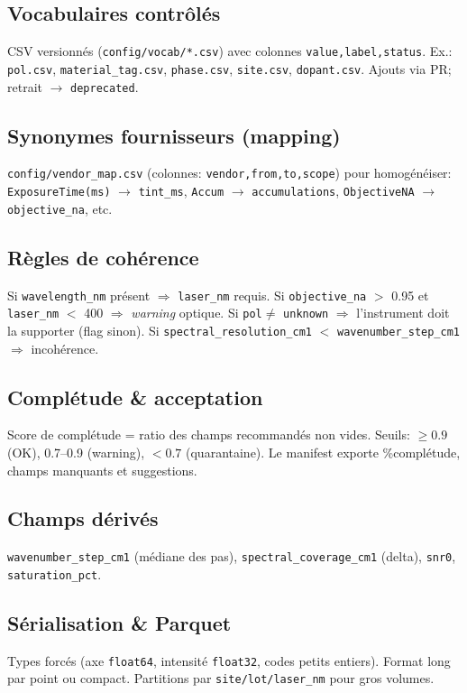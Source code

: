 \subsection{Vocabulaires contrôlés}
CSV versionnés (\texttt{config/vocab/*.csv}) avec colonnes \texttt{value,label,status}. Ex.: \texttt{pol.csv}, \texttt{material\_tag.csv}, \texttt{phase.csv}, \texttt{site.csv}, \texttt{dopant.csv}. Ajouts via PR; retrait $\rightarrow$ \texttt{deprecated}.

\subsection{Synonymes fournisseurs (mapping)}
\texttt{config/vendor\_map.csv} (colonnes: \texttt{vendor,from,to,scope}) pour homogénéiser: \texttt{ExposureTime(ms)} $\rightarrow$ \texttt{tint\_ms}, \texttt{Accum} $\rightarrow$ \texttt{accumulations}, \texttt{ObjectiveNA} $\rightarrow$ \texttt{objective\_na}, etc.

\subsection{Règles de cohérence}
Si \texttt{wavelength\_nm} présent $\Rightarrow$ \texttt{laser\_nm} requis. Si \texttt{objective\_na} $>$ 0.95 et \texttt{laser\_nm} $<$ 400 $\Rightarrow$ \textit{warning} optique. Si \texttt{pol}$\ne$ \texttt{unknown} $\Rightarrow$ l'instrument doit la supporter (flag sinon). Si \texttt{spectral\_resolution\_cm1} $<$ \texttt{wavenumber\_step\_cm1} $\Rightarrow$ incohérence.

\subsection{Complétude \& acceptation}
Score de complétude = ratio des champs recommandés non vides. Seuils: $\ge 0.9$ (OK), 0.7--0.9 (warning), $<0.7$ (quarantaine). Le manifest exporte \%complétude, champs manquants et suggestions.

\subsection{Champs dérivés}
\texttt{wavenumber\_step\_cm1} (médiane des pas), \texttt{spectral\_coverage\_cm1} (delta), \texttt{snr0}, \texttt{saturation\_pct}.

\subsection{Sérialisation \& Parquet}
Types forcés (axe \texttt{float64}, intensité \texttt{float32}, codes petits entiers). Format long par point ou compact. Partitions par \texttt{site/lot/laser\_nm} pour gros volumes.

